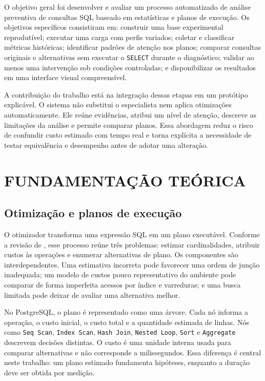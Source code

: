 \documentclass{UNESC}
\newcommand{\codigo}[1]{\texttt{#1}}
\begin{document}
O objetivo geral foi desenvolver e avaliar um processo automatizado de análise preventiva de consultas SQL baseado em estatísticas e planos de execução. Os objetivos específicos consistiram em: construir uma base experimental reprodutível; executar uma carga com perfis variados; coletar e classificar métricas históricas; identificar padrões de atenção nos planos; comparar consultas originais e alternativas sem executar o \codigo{SELECT} durante o diagnóstico; validar ao menos uma intervenção sob condições controladas; e disponibilizar os resultados em uma interface visual compreensível.

A contribuição do trabalho está na integração dessas etapas em um protótipo explicável. O sistema não substitui o especialista nem aplica otimizações automaticamente. Ele reúne evidências, atribui um nível de atenção, descreve as limitações da análise e permite comparar planos. Essa abordagem reduz o risco de confundir custo estimado com tempo real e torna explícita a necessidade de testar equivalência e desempenho antes de adotar uma alteração.

\section{FUNDAMENTAÇÃO TEÓRICA}

\subsection{Otimização e planos de execução}

O otimizador transforma uma expressão SQL em um plano executável. Conforme a revisão de , esse processo reúne três problemas: estimar cardinalidades, atribuir custos às operações e enumerar alternativas de plano. Os componentes são interdependentes. Uma estimativa incorreta pode favorecer uma ordem de junção inadequada; um modelo de custos pouco representativo do ambiente pode comparar de forma imperfeita acessos por índice e varreduras; e uma busca limitada pode deixar de avaliar uma alternativa melhor.

No PostgreSQL, o plano é representado como uma árvore. Cada nó informa a operação, o custo inicial, o custo total e a quantidade estimada de linhas. Nós como \codigo{Seq Scan}, \codigo{Index Scan}, \codigo{Hash Join}, \codigo{Nested Loop}, \codigo{Sort} e \codigo{Aggregate} descrevem decisões distintas. O custo é uma unidade interna usada para comparar alternativas e não corresponde a milissegundos. Essa diferença é central neste trabalho: um plano estimado fundamenta hipóteses, enquanto a duração deve ser obtida por medição.
\end{document}
